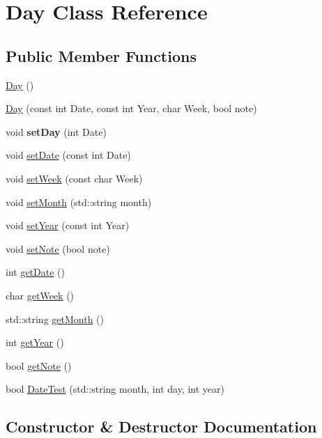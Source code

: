 \hypertarget{classDay}{}\section{Day Class Reference}
\label{classDay}
\subsection*{Public Member Functions}
\begin{DoxyCompactItemize}
\item 
\hyperlink{classDay_a0d38b5839dd80b179cb8f0669283b3aa}{Day} ()
\item 
\hyperlink{classDay_a4770dfd2d1166320d5c42a2d0a5f8129}{Day} (const int Date, const int Year, char Week, bool note)
\item 
void {\bfseries set\+Day} (int Date)\hypertarget{classDay_a0dcbab77f0504f01fdd9a8584b590121}{}\label{classDay_a0dcbab77f0504f01fdd9a8584b590121}

\item 
void \hyperlink{classDay_acb7725be13d29759b0f544e6780f78f8}{set\+Date} (const int Date)
\item 
void \hyperlink{classDay_a5500b4bf61375c465fb6160564bab4cc}{set\+Week} (const char Week)
\item 
void \hyperlink{classDay_aa6fc8b1b08074305e6b0dd3f4bc21151}{set\+Month} (std\+::string month)
\item 
void \hyperlink{classDay_a9fc013d905327fd70003970125247d91}{set\+Year} (const int Year)
\item 
void \hyperlink{classDay_a40f873f51621bdb3cf657e127d43cdaf}{set\+Note} (bool note)
\item 
int \hyperlink{classDay_a6161ef9f7717d596af00031cc362fa04}{get\+Date} ()
\item 
char \hyperlink{classDay_ad8c4008d27634a6da47eee92cb4f610a}{get\+Week} ()
\item 
std\+::string \hyperlink{classDay_ae10fc576ccdf6d58ef42c8cd1b371401}{get\+Month} ()
\item 
int \hyperlink{classDay_acec9a2c25c4e19fa6f46cd2671dfa51d}{get\+Year} ()
\item 
bool \hyperlink{classDay_a568ddb3832feedf479c0b44cea4f978f}{get\+Note} ()
\item 
bool \hyperlink{classDay_afb77f4b9df921cfb4176ba6ef309b9b8}{Date\+Test} (std\+::string month, int day, int year)
\end{DoxyCompactItemize}


\subsection{Constructor \& Destructor Documentation}
